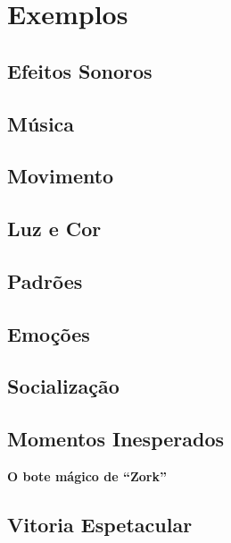 \expandafter\documentclass\expandafter[table, usenames, svgnames, dvipsnames, \classopts]{beamer}
\begin{document}
\section{Exemplos}

\subsection{Efeitos Sonoros}

\subsection{Música}

\subsection{Movimento}

\subsection{Luz e Cor}

\subsection{Padrões}

\subsection{Emoções}

\subsection{Socialização}

\subsection{Momentos Inesperados}

\begin{frame}{\textbf{O bote mágico de ``Zork''}}


\end{frame}

\subsection{Vitoria Espetacular}
\end{document}

